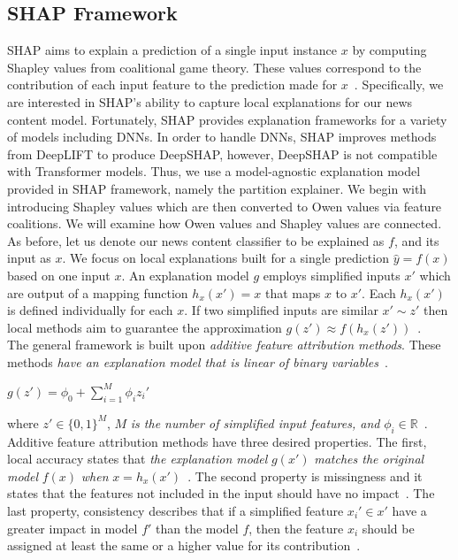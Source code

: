\subsection{SHAP Framework}
\label{subsec:ExplainingNewsContentModels_SHAPFramework}
SHAP aims to explain a prediction of a single input instance $x$ by computing Shapley values from coalitional game
theory. These values correspond to the contribution of each input feature to the prediction made for $x$~\parencite{InterpretableMachineLearning_Molnar}. Specifically, we are interested in SHAP's ability to capture local explanations
for our news content model. Fortunately, SHAP provides explanation frameworks for a variety of models including DNNs. In order to handle DNNs, SHAP improves methods from DeepLIFT to produce DeepSHAP, however, DeepSHAP is not compatible with Transformer models. Thus, we use a model-agnostic explanation model provided in SHAP framework, namely the partition explainer. We begin with introducing Shapley values which are then converted to Owen values via feature coalitions. We will examine how Owen values and Shapley values are connected.\\
As before, let us denote our news content classifier to be explained as $f$, and its input as $x$. We focus on local explanations built for a single prediction $\hat{y} = f(x)$ based on one input $x$. An explanation model $g$ employs simplified inputs $x'$ which are output of a mapping function $h_x(x') = x$ that maps $x$ to $x'$. Each $h_x(x')$ is defined individually for each $x$. If two simplified inputs are similar $x' \sim z'$ then local methods aim to guarantee the approximation $g(z') \approx f(h_x(z'))$~\parencite{AUnifiedApproach_Lundberg}.\\
The general framework is built upon \emph{additive feature attribution methods}. These methods \emph{have an explanation model that is linear of binary variables}~\parencite{AUnifiedApproach_Lundberg}.\\
\begin{center}
    $g(z') = \phi_0 + \sum\limits_{i=1}^M \phi_i z_i'$
\end{center}
where $z' \in \{0, 1\}^M$, $M$ \emph{is the number of simplified input features, and} $\phi_i \in \mathbb{R}$~\parencite{AUnifiedApproach_Lundberg}. Additive feature attribution methods have three desired properties. The first, local accuracy states that \emph{the explanation model} $g(x')$ \emph{matches the original model} $f(x)$ \emph{when} $x = h_x(x')$~\parencite{AUnifiedApproach_Lundberg}. The second property is missingness and it states that the features not included in the input should have no impact~\parencite{AUnifiedApproach_Lundberg}. The last property, consistency describes that if a simplified feature $x_i' \in x'$ have a greater impact in model $f'$ than the model $f$, then the feature $x_i$ should be assigned at least the same or a higher value for its contribution~\parencite{AUnifiedApproach_Lundberg}. \\
